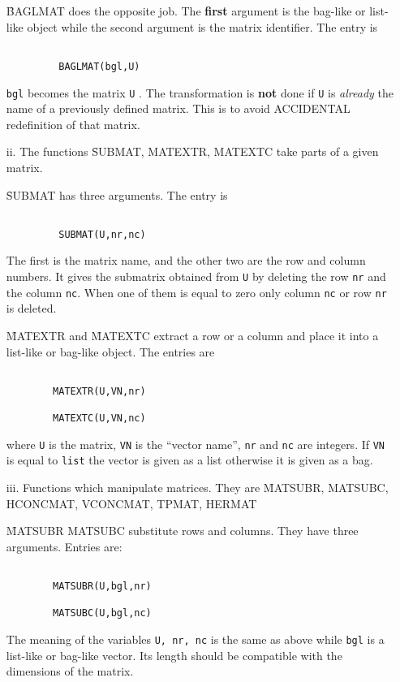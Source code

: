 \begin{itemize}
\f{BAGLMAT} does the opposite job. The {\bf first} argument is the
bag-like or list-like object while the second argument is the matrix
identifier. The entry is
\begin{verbatim}

         BAGLMAT(bgl,U)

\end{verbatim}
\verb+bgl+ becomes the matrix \verb+U+ . The transformation is
{\bf not} done if \verb+U+  is {\em already} the  name of a
previously  defined matrix. This is to avoid ACCIDENTAL redefinition
of that matrix.
\item[ii.]
The functions \f{SUBMAT, MATEXTR, MATEXTC} take parts of a given matrix.

\f{SUBMAT} has three arguments. The entry is
\begin{verbatim}

         SUBMAT(U,nr,nc)

\end{verbatim}
The first is the matrix name, and the other two are the row  and column
numbers.  It gives the
submatrix obtained from \verb+U+ by deleting the row \verb+nr+ and
the column \verb+nc+.
When one of them is equal to zero only column \verb+nc+
or row \verb+nr+ is deleted.

\f{MATEXTR} and \f{MATEXTC} extract a row or a column and place it into
a list-like or bag-like object.
The entries are
\begin{verbatim}

        MATEXTR(U,VN,nr)

        MATEXTC(U,VN,nc)

\end{verbatim}
where \verb+U+ is the matrix,  \verb+VN+ is the ``vector name'',
\verb+nr+  and \verb+nc+ are integers.  If \verb+VN+  is equal
to {\tt list} the vector  is given  as a list otherwise  it is
given as a bag.
\item[iii.]
Functions which manipulate matrices. They are
\f{MATSUBR, MATSUBC, HCONCMAT, VCONCMAT, TPMAT, HERMAT}

\f{MATSUBR MATSUBC} substitute rows and columns. They have three arguments.
Entries are:
\begin{verbatim}

        MATSUBR(U,bgl,nr)

        MATSUBC(U,bgl,nc)

\end{verbatim}
The meaning of the variables \verb+U, nr, nc+ is the same as above
while \verb+bgl+ is a list-like or bag-like vector.
Its  length should be compatible with the dimensions of the matrix.


\end{itemize}
